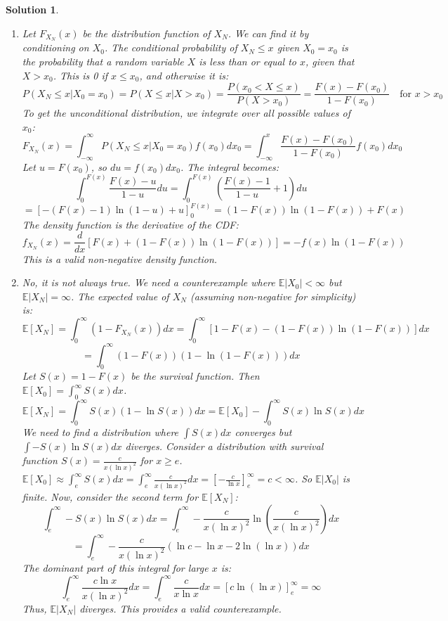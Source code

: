 \documentclass[12pt]{amsart}
\newtheorem*{solution}{Solution}
\begin{document}
\begin{solution}
\begin{enumerate}[label=(\alph*)]
\item Let $F_{X_N}(x)$ be the distribution function of $X_N$. We can find it by conditioning on $X_0$.
The conditional probability of $X_N \le x$ given $X_0=x_0$ is the probability that a random variable $X$ is less than or equal to $x$, given that $X > x_0$. This is 0 if $x \le x_0$, and otherwise it is:
$$ P(X_N \le x | X_0=x_0) = P(X \le x | X > x_0) = \frac{P(x_0 < X \le x)}{P(X > x_0)} = \frac{F(x) - F(x_0)}{1 - F(x_0)} \quad \text{for } x > x_0 $$
To get the unconditional distribution, we integrate over all possible values of $x_0$:
$$ F_{X_N}(x) = \int_{-\infty}^{\infty} P(X_N \le x | X_0=x_0) f(x_0) dx_0 = \int_{-\infty}^{x} \frac{F(x) - F(x_0)}{1 - F(x_0)} f(x_0) dx_0 $$
Let $u = F(x_0)$, so $du = f(x_0) dx_0$. The integral becomes:
$$ \int_{0}^{F(x)} \frac{F(x) - u}{1-u} du = \int_{0}^{F(x)} \left(\frac{F(x)-1}{1-u} + 1\right) du $$
$$ = [-(F(x)-1)\ln(1-u) + u]_0^{F(x)} = (1-F(x))\ln(1-F(x)) + F(x) $$
The density function is the derivative of the CDF:
$$ f_{X_N}(x) = \frac{d}{dx} \left[ F(x) + (1-F(x))\ln(1-F(x)) \right] = -f(x)\ln(1-F(x)) $$
This is a valid non-negative density function.

\item No, it is not always true. We need a counterexample where $\mathbb{E}|X_0| < \infty$ but $\mathbb{E}|X_N| = \infty$.
The expected value of $X_N$ (assuming non-negative for simplicity) is:
$$ \mathbb{E}[X_N] = \int_0^\infty (1-F_{X_N}(x))dx = \int_0^\infty [1 - F(x) - (1-F(x))\ln(1-F(x))]dx $$
$$ = \int_0^\infty (1-F(x))(1 - \ln(1-F(x)))dx $$
Let $S(x)=1-F(x)$ be the survival function. Then $\mathbb{E}[X_0] = \int_0^\infty S(x)dx$.
$$ \mathbb{E}[X_N] = \int_0^\infty S(x)(1 - \ln S(x))dx = \mathbb{E}[X_0] - \int_0^\infty S(x)\ln S(x) dx $$
We need to find a distribution where $\int S(x)dx$ converges but $\int -S(x)\ln S(x)dx$ diverges.
Consider a distribution with survival function $S(x) = \frac{c}{x(\ln x)^2}$ for $x \ge e$.
$\mathbb{E}[X_0] \approx \int_e^\infty S(x)dx = \int_e^\infty \frac{c}{x(\ln x)^2}dx = \left[-\frac{c}{\ln x}\right]_e^\infty = c < \infty$.
So $\mathbb{E}|X_0|$ is finite.
Now, consider the second term for $\mathbb{E}[X_N]$:
$$ \int_e^\infty -S(x)\ln S(x) dx = \int_e^\infty -\frac{c}{x(\ln x)^2}\ln\left(\frac{c}{x(\ln x)^2}\right)dx $$
$$ = \int_e^\infty -\frac{c}{x(\ln x)^2}(\ln c - \ln x - 2\ln(\ln x))dx $$
The dominant part of this integral for large $x$ is:
$$ \int_e^\infty \frac{c\ln x}{x(\ln x)^2}dx = \int_e^\infty \frac{c}{x\ln x}dx = [c\ln(\ln x)]_e^\infty = \infty $$
Thus, $\mathbb{E}|X_N|$ diverges. This provides a valid counterexample.
\end{enumerate}
\end{solution}
\end{document}
